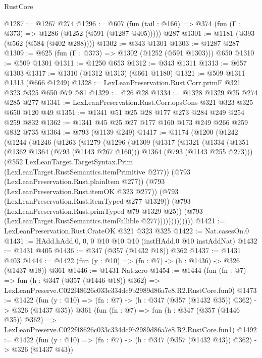 \begin{lexlean}{RustCore}
\begin{coremodule}
@1287 := @1267 @274
@1296 := @607 (fun (tail : @166) => @374 (fun (Γ : @373) => @1286 (@1252 (@591 (@1287 @405))))) @287
@1301 := @1181 (@393 (@562 (@584 (@402 @288))))
@1302 := @343 @1301
@1303 := @1287 @287
@1309 := @625 (fun (Γ : @373) => @1302 (@1252 (@591 @1303))) @650
@1310 := @509 @1301
@1311 := @1250 @653
@1312 := @343 @1311
@1313 := @657 @1303
@1317 := @1310 (@1312 @1313) (@661 @1180)
@1321 := @509 @1311 @1313 (@666 @1249)
@1328 := LexLeanPreservation.Rust.Corr.primF @321 @323 @325 @650 @79 @81
@1329 := @26 @28
@1334 := @1328 @1329 @25 @274 @285 @277
@1341 := LexLeanPreservation.Rust.Corr.opsCons @321 @323 @325 @650 @120 @49
@1351 := @1341 @51 @25 @28 @177 @273 @284 @249 @254 @259 @832
@1362 := @1341 @45 @25 @27 @177 @160 @173 @249 @266 @259 @832 @735
@1364 := @793 (@1139 @249)
@1417 := @1174
    (@1200
      (@1242
        (@1244
          (@1246
            (@1263
              (@1279
                (@1296
                  (@1309
                    (@1317
                      (@1321
                        (@1334
                          (@1351
                            (@1362 @1364 (@793 (@1143 @267 @160)))
                            @1364
                            (@793 (@1143 @255 @273)))
                          (@552
                            LexLeanTarget.TargetSyntax.Prim
                            (LexLeanTarget.RustSemantics.itemPrimitive @277))
                          (@793 (LexLeanPreservation.Rust.plainItem @277))
                          (@793 (LexLeanPreservation.Rust.itemOK @323 @277))
                          (@793 (LexLeanPreservation.Rust.itemTyped @277 @1329))
                          (@793 (LexLeanPreservation.Rust.primTyped @79 @1329 @25))
                          (@793 (LexLeanTarget.RustSemantics.itemFallible @277)))))))))))))
@1421 := LexLeanPreservation.Rust.CrateOK @321 @323 @325
@1422 := Nat.casesOn.{0}
@1431 := HAdd.hAdd.{0, 0, 0} @10 @10 @10 (instHAdd.{0} @10 instAddNat)
@1432 := @1431 @405
@1436 := @347 (@357 (@1432 @18)) @362
@1437 := @1431 @403
@1444 := @1422 (fun (y : @10) => (fn : @7) -> (h : @1436) -> @326 (@1437 @18)) @361
@1446 := @1431 Nat.zero
@1454 := @1444
    (fun (fn : @7) =>
    fun (h : @347 (@357 (@1446 @18)) @362) =>
    LexLeanPreserve.C022f48626c033c334dc9b2989d86a7e8.R2.RustCore.fun0)
@1473 := @1422
    (fun (y : @10) => (fn : @7) -> (h : @347 (@357 (@1432 @35)) @362) -> @326 (@1437 @35))
    @361
    (fun (fn : @7) =>
    fun (h : @347 (@357 (@1446 @35)) @362) =>
    LexLeanPreserve.C022f48626c033c334dc9b2989d86a7e8.R2.RustCore.fun1)
@1492 := @1422
    (fun (y : @10) => (fn : @7) -> (h : @347 (@357 (@1432 @43)) @362) -> @326 (@1437 @43))

\end{coremodule}
\end{lexlean}
